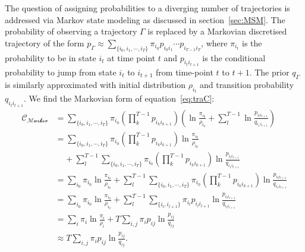 The question of assigning probabilities to a diverging number of trajectories is addressed via Markov state modeling as discussed in section~\ref{sec:MSM}. The probability of observing a trajectory $\Gamma$ is replaced by a Markovian discretised trajectory of the form 
 $p_\Gamma \approx \sum_{\{i_{0}, i_{1}, \cdots , i_{T} \}} \pi_{i_0} p_{i_0 i_1} \cdots p_{i_{T-1} i_{T}} $,
where $\pi_{i_t}$ is the probability to be in state $i_t$ at time point $t$ and 
$p_{i_{t} i_{t+1}}$ is the conditional probability to jump from state $i_{t}$ to $i_{t+1}$ from time-point $t$ to $t+1$. The prior $q_\Gamma$ is similarly approximated with initial distribution $\rho_{i_t}$ and transition probability $q_{i_{t} i_{t+1}}$. We find the Markovian form of equation~\ref{eq:traC}:
\begin{equation}
    \begin{aligned}
    \mathcal{C_{\text{Markov}}} & = \sum_{\{ i_0, i_1 , \cdots , i_T \}} \pi_{i_0} 
     \left ( \prod^{T-1}_{k}  p_{i_k i_{k+1}} \right) \left ( \ln \frac{\pi_{i_0}}{\rho_{i_0}} 
    + \sum^{T-1}_{l} \ln \frac{p_{i_l i_{l+1}}}{q_{i_1 i_{l+1}}}  \right ) \\
    & = \sum_{\{ i_0, i_1 , \cdots , i_T \}} \pi_{i_0} 
    \left ( \prod^{T-1}_{k}  p_{i_k i_{k+1}} \right)  \ln \frac{\pi_{i_0}}{\rho_{i_0}} \\
    &\;\;\;\;+ \sum^{T-1}_{l} \sum_{\{ i_0, i_1 , \cdots , i_T \}} \pi_{i_0} 
    \left ( \prod^{T-1}_{k}  p_{i_k i_{k+1}} \right) \ln \frac{p_{i_l i_{l+1}}}{q_{i_1 i_{l+1}}}\\ 
    & = \sum_{i_0} \pi_{i_0} \ln \frac{\pi_{i_0}}{\rho_{i_0}} + \sum^{T-1}_{l} \sum_{\{ i_0, i_1 , \cdots , i_T \}} \pi_{i_0} 
    \left ( \prod^{T-1}_{k}  p_{i_k i_{k+1}} \right) \ln \frac{p_{i_l i_{l+1}}}{q_{i_1 i_{l+1}}}\\ 
    & = \sum_{i_0} \pi_{i_0} \ln \frac{\pi_{i_0}}{\rho_{i_0}} + 
    \sum^{T-1}_{l} \sum_{\{ i_l, i_{l+1} \}} \pi_{i_l} p_{i_l i_{l+1}} 
    \ln \frac{p_{i_l i_{l+1}}}{q_{i_l i_{l+1}}}\\
    & = \sum_i \pi_{i} \ln \frac{\pi_{i}}{\rho_{i}} + T \sum_{i,j} \pi_i p_{ij} 
        \ln \frac{p_{ij}}{q_{ij}}\\
    & \approx T \sum_{i,j} \pi_i p_{ij} \ln \frac{p_{ij}}{q_{ij}} .
\end{aligned}
\end{equation}
